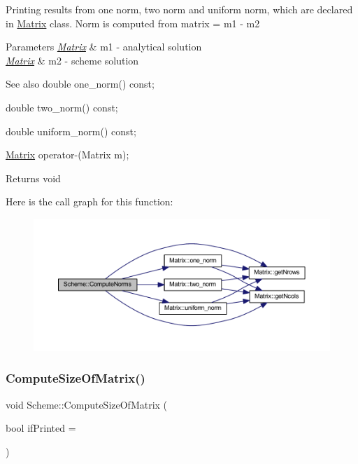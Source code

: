 Printing results from one norm, two norm and uniform norm, which are declared in \mbox{\hyperlink{class_matrix}{Matrix}} class. Norm is computed from matrix = m1 -\/ m2 
\begin{DoxyParams}{Parameters}
{\em \mbox{\hyperlink{class_matrix}{Matrix}}} & m1 -\/ analytical solution \\
\hline
{\em \mbox{\hyperlink{class_matrix}{Matrix}}} & m2 -\/ scheme solution \\
\hline
\end{DoxyParams}
\begin{DoxySeeAlso}{See also}
double one\+\_\+norm() const; 

double two\+\_\+norm() const; 

double uniform\+\_\+norm() const; 

\mbox{\hyperlink{class_matrix}{Matrix}} operator-\/(\+Matrix m); 
\end{DoxySeeAlso}
\begin{DoxyReturn}{Returns}
void 
\end{DoxyReturn}
Here is the call graph for this function\+:
\nopagebreak
\begin{figure}[H]
\begin{center}
\leavevmode
\includegraphics[width=350pt]{class_scheme_ae098876d0287ac2bf5220608db2a8468_cgraph}
\end{center}
\end{figure}
\mbox{\label{class_scheme_a0364e328d78e84be15d293a66d946008}} 
\subsubsection{\texorpdfstring{Compute\+Size\+Of\+Matrix()}{ComputeSizeOfMatrix()}}
{\footnotesize\ttfamily void Scheme\+::\+Compute\+Size\+Of\+Matrix (\begin{DoxyParamCaption}\item[{bool}]{if\+Printed = {} }\end{DoxyParamCaption})\hspace{0.3cm}{\ttfamily [protected]}}

